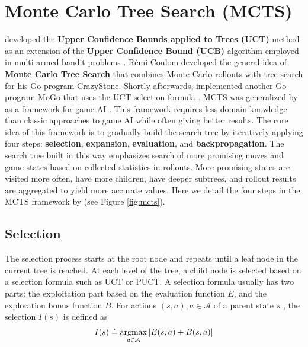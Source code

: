 \section{Monte Carlo Tree Search (MCTS)} \label{sec:mcts}

\citeauthor{BanditBasedMonteCarlo_Kocsis.Szepesvari_2006} developed the \textbf{Upper Confidence Bounds applied to Trees (UCT)} method as an extension of the \textbf{Upper Confidence Bound (UCB)} algorithm employed in multi-armed bandit problems \cite{BanditBasedMonteCarlo_Kocsis.Szepesvari_2006}.
Rémi Coulom developed the general idea of \textbf{Monte Carlo Tree Search} that combines Monte Carlo rollouts with tree search \cite{EfficientSelectivityBackup_Coulom_2007} for his Go program CrazyStone.
Shortly afterwards,
\citeauthor{ModificationUCTPatterns_Gelly.Wang.ea_2006} implemented another Go program MoGo that uses the UCT selection formula \cite{ModificationUCTPatterns_Gelly.Wang.ea_2006}.
MCTS was generalized by \citeauthor{MonteCarloTreeSearch_Chaslot.Bakkes.ea_2008} as a framework for game AI \cite{MonteCarloTreeSearch_Chaslot.Bakkes.ea_2008}.
This framework requires less domain knowledge than classic approaches to game AI while often giving better results.
The core idea of this framework is to gradually build the search tree by iteratively applying four steps: \textbf{selection}, \textbf{expansion}, \textbf{evaluation}, and \textbf{backpropagation}.
The search tree built in this way emphasizes search of more promising moves and game states based on collected statistics in rollouts.
More promising states are visited more often, have more children, have deeper subtrees, and rollout results are aggregated to yield more accurate values. Here we detail the four steps in the MCTS framework by \citeauthor{MonteCarloTreeSearch_Chaslot.Bakkes.ea_2008} (see Figure \ref{fig:mcts}).


\subsection{Selection}
The selection process starts at the root node and repeats until a leaf node in the current tree is reached.
At each level of the tree, a child node is selected based on a selection formula such as UCT or PUCT.
A selection formula usually has two parts: the exploitation part based on the evaluation function $E$, and the exploration bonus function $B$.
For actions $(s, a), a \in \mathcal{A}$ of a parent state $s$ , the selection $I(s)$ is defined as
\begin{align}
    I(s) \doteq \operatorname*{argmax}_{a \in \mathcal{A}}{\left[ E(s, a) + B(s, a) \right]}
    \label{eq:mcts_selection}
\end{align}

